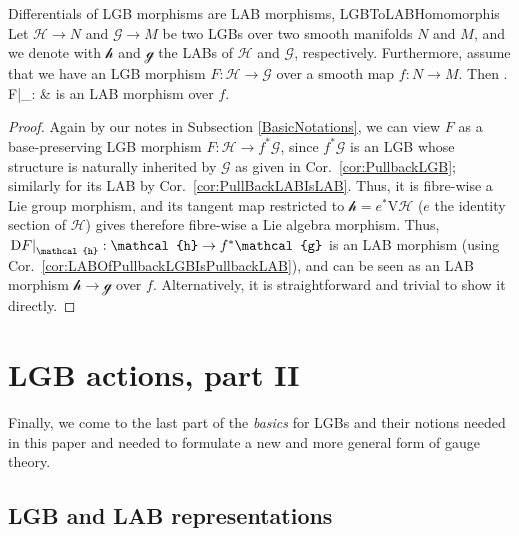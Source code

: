 \documentclass[a4paper,oneside,11pt,bibliography=totoc]{scrartcl}
\def\bas#1\eas{\begin{align*}#1\end{align*}}
\theoremstyle{plain}
\theoremstyle{remark}
\theoremstyle{definition}
\begin{document}
\begin{corollaries}{Differentials of LGB morphisms are LAB morphisms, \newline \cite[\S 3.5, section about morphisms, page 124f.]{mackenzieGeneralTheory}}{LGBToLABHomomorphis}
Let $\mathcal{H} \to N$ and $\mathcal{G} \to M$ be two LGBs over two smooth manifolds $N$ and $M$, and we denote with $\mathcal{h}$ and $\mathcal{g}$ the LABs of $\mathcal{H}$ and $\mathcal{G}$, respectively. Furthermore, assume that we have an LGB morphism $F: \mathcal{H} \to \mathcal{G}$ over a smooth map $f: N \to M$. Then
\bas
\mleft. F\mright|_{}:  &\to {}
\eas
is an LAB morphism over $f$.
\end{corollaries}

\begin{proof}
\leavevmode\newline
Again by our notes in Subsection \ref{BasicNotations}, we can view $F$ as a base-preserving LGB morphism $F: \mathcal{H} \to f^*\mathcal{G}$, since $f^*\mathcal{G}$ is an LGB whose structure is naturally inherited by $\mathcal{G}$ as given in Cor.\ \ref{cor:PullbackLGB}; similarly for its LAB by Cor.\ \ref{cor:PullBackLABIsLAB}. Thus, it is fibre-wise a Lie group morphism, and its tangent map restricted to $\mathcal{h} = e^*\mathrm{V}\mathcal{H}$ ($e$ the identity section of $\mathcal{H}$) gives therefore fibre-wise a Lie algebra morphism. Thus, $\mleft.\mathrm{D} F\mright|_{\mathcal{h}}: \mathcal{h} \to f^*\mathcal{g}$ is an LAB morphism (using Cor.\ \ref{cor:LABOfPullbackLGBIsPullbackLAB}), and can be seen as an LAB morphism $\mathcal{h} \to \mathcal{g}$ over $f$. Alternatively, it is straightforward and trivial to show it directly.
\end{proof}

\section{LGB actions, part II}

Finally, we come to the last part of the \textit{basics} for LGBs and their notions needed in this paper and needed to formulate a new and more general form of gauge theory.

\subsection{LGB and LAB representations}
\end{document}

